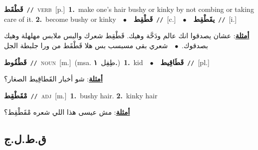 \documentclass[10pt,a4paper,twoside]{article} %
\begin{document}
\begin{multicols}{2}
{\setlength\topsep{0pt}\textbf{\foreignlanguage{arabic}{قَطْقَط}}\ {\color{gray}\texttt{//}\color{black}}\ \textsc{verb}\ [p.]\ \textbf{1.}~make one's hair bushy or kinky by not combing or taking care of it.  \textbf{2.}~become bushy or kinky\ \ $\bullet$\ \ \setlength\topsep{0pt}\textbf{\foreignlanguage{arabic}{قَطْقِط}}\ {\color{gray}\texttt{//}\color{black}}\ [c.]\ \ $\bullet$\ \ \setlength\topsep{0pt}\textbf{\foreignlanguage{arabic}{يقَطْقِط}}\ {\color{gray}\texttt{//}\color{black}}\ [i.]\  \begin{flushright}\color{gray}\foreignlanguage{arabic}{\textbf{\underline{\foreignlanguage{arabic}{أمثلة}}}: عشان يصدقوا انك عالم ودَحَّة وهيك. قَطْقِط شعرك والبس ملابس مهلهلة وهيك بصدقوك.\ $\bullet$\ \  شعري بقى مسبسب بس هلا قَطْقَط من ورا جلبطة الجل}\end{flushright}\color{black}} \vspace{2mm}

{\setlength\topsep{0pt}\textbf{\foreignlanguage{arabic}{قَطْقُوط}}\ {\color{gray}\texttt{//}\color{black}}\ \textsc{noun}\ [m.]\ \color{gray}(msa. \foreignlanguage{arabic}{طِفِل}~\foreignlanguage{arabic}{\textbf{١.}})\color{black}\ \textbf{1.}~kid\ \ $\bullet$\ \ \setlength\topsep{0pt}\textbf{\foreignlanguage{arabic}{قَطَاقِيط}}\ {\color{gray}\texttt{//}\color{black}}\ [pl.]\  \begin{flushright}\color{gray}\foreignlanguage{arabic}{\textbf{\underline{\foreignlanguage{arabic}{أمثلة}}}: شو أخبار القَطاقِيط الصغار؟}\end{flushright}\color{black}} \vspace{2mm}

{\setlength\topsep{0pt}\textbf{\foreignlanguage{arabic}{مْقَطْقِط}}\ {\color{gray}\texttt{//}\color{black}}\ \textsc{adj}\ [m.]\ \textbf{1.}~bushy hair.  \textbf{2.}~kinky hair\  \begin{flushright}\color{gray}\foreignlanguage{arabic}{\textbf{\underline{\foreignlanguage{arabic}{أمثلة}}}: مش عيسى هذا اللي شعره مْقَطْقِط؟}\end{flushright}\color{black}} \vspace{2mm}

\vspace{-3mm}
\subsection*{\color{blue}\foreignlanguage{arabic}{ق.ط.ل.ج}\color{blue}{}} 


\end{multicols}
\end{document}
